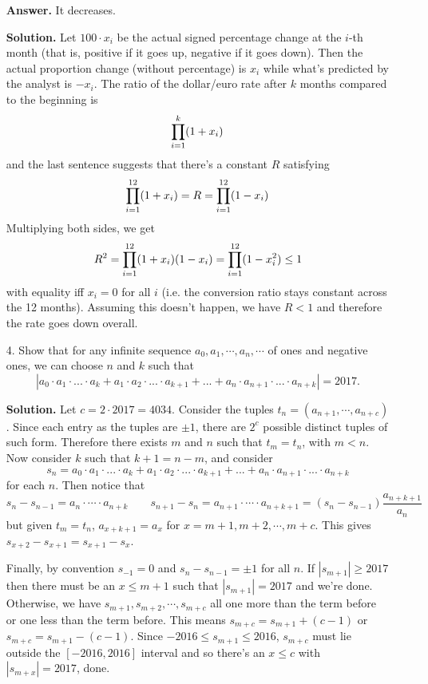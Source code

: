 \documentclass[11pt,a4paper]{article}
\begin{document}
\begin{enumerate}
	\textbf{Answer.} It decreases.
	
	\textbf{Solution.} Let $100\cdot x_i$ be the actual signed percentage change at the $i$-th month (that is, positive if it goes up, negative if it goes down). Then the actual proportion change (without percentage) is $x_i$ while what's predicted by the analyst is $-x_i$. The ratio of the dollar/euro rate after $k$ months compared to the beginning is 
	\[
	\displaystyle\prod_{i=1}^k (1+x_i)
	\]
	and the last sentence suggests that there's a constant $R$ satisfying 
	\[
	\displaystyle\prod_{i=1}^{12} (1+x_i) = R = \displaystyle\prod_{i=1}^{12} (1-x_i)
	\]
	Multiplying both sides, we get 
	\[
	R^2 = \displaystyle\prod_{i=1}^{12} (1+x_i) (1-x_i) = \displaystyle\prod_{i=1}^{12} (1-x_i^2)\le 1
	\]
	with equality iff $x_i=0$ for all $i$ (i.e. the conversion ratio stays constant across the 12 months). Assuming this doesn't happen, we have $R<1$ and therefore the rate goes down overall. 
	
	\item [4.] Show that for any infinite sequence $a_0, a_1, \cdots , a_n, \cdots$ of ones and negative ones, we can choose $n$ and $k$ such that
	\[
	|a_0 \cdot a_1 \cdot ...\cdot a_k + a_1 \cdot a_2 \cdot...\cdot a_{k+1} +...+a_n \cdot a_{n+1} \cdot...\cdot a_{n+k}|=2017.
	\]
	
	\textbf{Solution.} 
	Let $c=2\cdot 2017=4034$. 
	Consider the tuples $t_n = (a_{n+1}, \cdots , a_{n+c})$. Since each entry as the tuples are $\pm 1$, there are $2^{c}$ possible distinct tuples of such form. Therefore there exists $m$ and $n$ such that $t_m=t_n$, with $m< n$. Now consider $k$ such that $k+1=n-m$, and consider 
	\[
	s_n = a_0 \cdot a_1 \cdot ...\cdot a_k + a_1 \cdot a_2 \cdot...\cdot a_{k+1} +...+a_n \cdot a_{n+1} \cdot...\cdot a_{n+k}
	\]
	for each $n$. Then notice that 
	\[
	s_{n}-s_{n-1} = a_n\cdot \cdots \cdot a_{n+k}\qquad
	s_{n+1}-s_n = a_{n+1}\cdot \cdots \cdot a_{n+k+1} = (s_{n}-s_{n-1})\frac{a_{n+k+1}}{a_{n}}
	\]
	but given $t_m=t_n$, $a_{x+k+1}=a_x$ for $x=m+1, m+2, \cdots , m+c$. This gives $s_{x+2}-s_{x+1}=s_{x+1}-s_x$. 
	
	Finally, by convention $s_{-1}=0$ and $s_n-s_{n-1}=\pm 1$ for all $n$. If $|s_{m+1}|\ge 2017$ then there must be an $x\le m+1$ such that $|s_{m+1}|=2017$ and we're done. Otherwise, we have $s_{m+1}, s_{m+2}, \cdots , s_{m+c}$ all one more than the term before or one less than the term before. This means $s_{m+c}=s_{m+1}+(c-1)$ or $s_{m+c}=s_{m+1}-(c-1)$. Since $-2016\le s_{m+1}\le 2016$, $s_{m+c}$ must lie outside the $[-2016, 2016]$ interval and so there's an $x\le c$ with $|s_{m+x}|=2017$, done. 
	

\end{enumerate}
\end{document}
